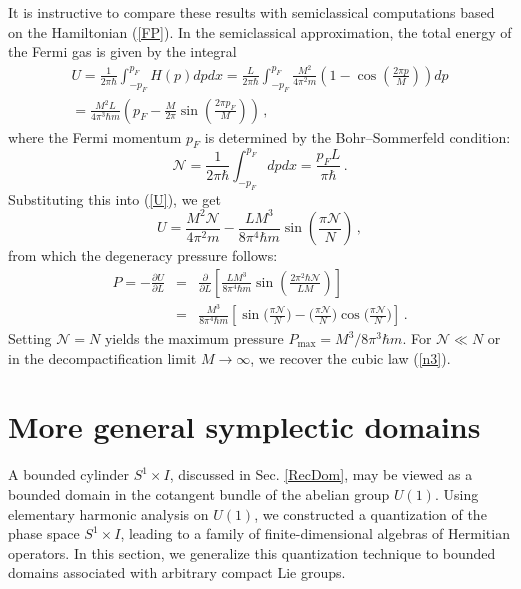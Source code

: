 \documentclass[12pt,a4paper]{article}
\numberwithin{equation}{section}
\theoremstyle{theorem}
\theoremstyle{remark}
\begin{document}
It is instructive  to compare these results with semiclassical computations based on the Hamiltonian (\ref{FP}).  In the semiclassical approximation, the total energy of the Fermi gas is given by the integral
\begin{equation}\label{U}
\begin{array}{c}
  \displaystyle  U=\frac{1}{2\pi\hbar}\int^{p_F}_{-p_F}H(p)dpdx=\frac{L}{2\pi\hbar}\int_{-p_F}^{p_F}\frac{M^2}{4\pi^2m}\left(1-\cos\left(\frac {2\pi p}{M}\right)\right)dp\\[7mm]
  \displaystyle  =\frac{M^2L}{4\pi^3\hbar m}
\left( p_F-\frac{M}{2\pi}\sin\left(\frac{2\pi p_F}{M}\right)\right)  \,,
\end{array}
\end{equation}
where the Fermi momentum $p_F$ is determined by the Bohr--Sommerfeld condition:
\begin{equation}
    \mathcal{N}=\frac{1}{2\pi\hbar}\int_{-p_F}^{p_F}dpdx=\frac{p_FL}{\pi\hbar}\,.
\end{equation}
Substituting this into (\ref{U}), we get
\begin{equation}
    U=\frac{M^2\mathcal{N}}{4\pi^2 m}
 -\frac{LM^3}{8\pi^4\hbar m}\sin\left(\frac{\pi \mathcal{N}}{N}\right)\,, 
 \end{equation}
 from which the degeneracy pressure follows:
\begin{equation}\label{Pres}
\begin{array}{rcl}
    P=\displaystyle -\frac{\partial U}{\partial L}&=&\displaystyle \frac{\partial}{\partial L}\left[\frac{LM^3}{8\pi^4\hbar m}\sin\left(\frac{2\pi^2\hbar\mathcal{N}}{LM}\right)\right]\\[5mm]
   &=&\displaystyle \frac{M^3}{8\pi^4\hbar m}\left[\sin\Big(\frac{\pi\mathcal N}{N}\Big) -\Big(\frac{\pi\mathcal N}{N}\Big) \cos\Big(\frac{\pi\mathcal N}{N}\Big) \right]\,.
    \end{array}
\end{equation}
Setting $\mathcal{N}=N$ yields the maximum pressure $P_{\mathrm{max}}=M^3/8\pi^3\hbar m$. For $\mathcal{N}\ll N$ or in the decompactification limit $M\to\infty$,  we recover the cubic law (\ref{n3}). 

\section{More general symplectic domains}

A bounded cylinder $S^1\times I$, discussed in Sec. \ref{RecDom}, may be viewed as a bounded domain in the cotangent bundle of the abelian group $U(1)$. Using elementary harmonic analysis on $U(1)$, we constructed a quantization of the phase space $S^1\times I$, leading to a family of finite-dimensional algebras of Hermitian operators. In this section,  we generalize this quantization technique to bounded domains associated with arbitrary compact Lie groups. 
\end{document}
